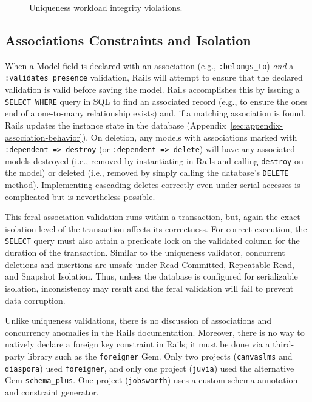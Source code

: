 \begin{figure}
\begin{minipage}{\columnwidth}
\end{minipage}
\caption{Uniqueness workload integrity violations.}
\label{fig:pk-workload}
\end{figure}


\subsection{Associations Constraints and Isolation}

When a Model field is declared with an association (e.g.,
\texttt{:belongs\_to}) \textit{and} a \texttt{:validates\_presence}
validation, Rails will attempt to ensure that the declared validation
is valid before saving the model. Rails accomplishes this by issuing a
\texttt{SELECT WHERE} query in SQL to find an associated record (e.g.,
to ensure the ones end of a one-to-many relationship exists) and, if a
matching association is found, Rails updates the instance state in the
database (Appendix~\ref{sec:appendix-association-behavior}). On
deletion, any models with associations marked with \texttt{:dependent =>
  destroy} (or \texttt{:dependent  => delete}) will have any associated
models destroyed (i.e., removed by instantiating in Rails and calling
\texttt{destroy} on the model) or deleted (i.e., removed by simply
calling the database's \texttt{DELETE} method). Implementing cascading
deletes correctly even under serial accesses is complicated but is
nevertheless possible.

This feral association validation runs within a transaction, but,
again the exact isolation level of the transaction affects its
correctness. For correct execution, the \texttt{SELECT} query must
also attain a predicate lock on the validated column for the duration
of the transaction. Similar to the uniqueness validator, concurrent
deletions and insertions are unsafe under Read Committed, Repeatable
Read, and Snapshot Isolation. Thus, unless the database is configured
for serializable isolation, inconsistency may result and the feral
validation will fail to prevent data corruption.

Unlike uniqueness validations, there is no discussion of associations
and concurrency anomalies in the Rails documentation. Moreover, there
is no way to natively declare a foreign key constraint in Rails; it
must be done via a third-party library such as the \texttt{foreigner}
Gem. Only two projects (\texttt{canvaslms} and \texttt{diaspora}) used
\texttt{foreigner}, and only one project (\texttt{juvia}) used the
alternative Gem \texttt{schema\_plus}. One project
(\texttt{jobsworth}) uses a custom schema annotation and constraint
generator.

